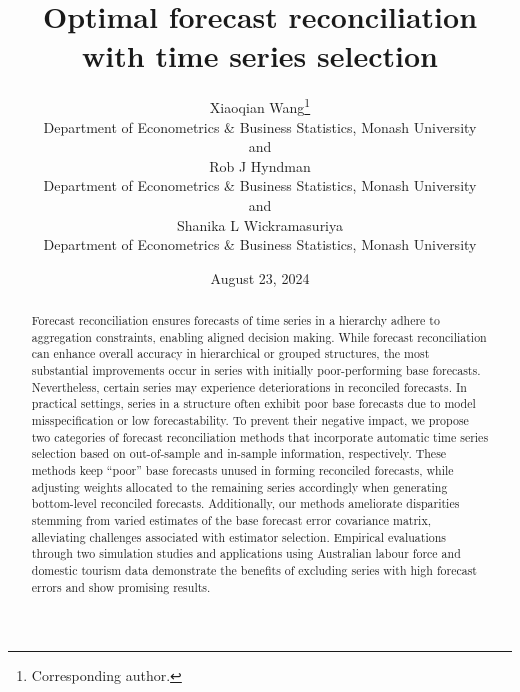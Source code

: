 \documentclass[
  11pt]{article}
\theoremstyle{plain}
\theoremstyle{remark}
\begin{document}
\def\spacingset#1{\renewcommand{\baselinestretch}%
{#1}\small\normalsize} \spacingset{1}

\renewcommand*{\arraystretch}{0.5} %


\date{August 23, 2024}
\title{\bf Optimal forecast reconciliation with time series selection}
\author{
Xiaoqian Wang\thanks{Corresponding author.} \vspace{0.2em}\\
Department of Econometrics \& Business Statistics, Monash
University \vspace{0.2em}\\
and \vspace{0.2em}\\Rob J Hyndman \vspace{0.2em}\\
Department of Econometrics \& Business Statistics, Monash
University \vspace{0.2em}\\
and \vspace{0.2em}\\Shanika L Wickramasuriya \vspace{0.2em}\\
Department of Econometrics \& Business Statistics, Monash
University \vspace{0.2em}\\
}
\maketitle

\bigskip
\bigskip
\begin{abstract}
Forecast reconciliation ensures forecasts of time series in a hierarchy
adhere to aggregation constraints, enabling aligned decision making.
While forecast reconciliation can enhance overall accuracy in
hierarchical or grouped structures, the most substantial improvements
occur in series with initially poor-performing base forecasts.
Nevertheless, certain series may experience deteriorations in reconciled
forecasts. In practical settings, series in a structure often exhibit
poor base forecasts due to model misspecification or low
forecastability. To prevent their negative impact, we propose two
categories of forecast reconciliation methods that incorporate automatic
time series selection based on out-of-sample and in-sample information,
respectively. These methods keep ``poor'' base forecasts unused in
forming reconciled forecasts, while adjusting weights allocated to the
remaining series accordingly when generating bottom-level reconciled
forecasts. Additionally, our methods ameliorate disparities stemming
from varied estimates of the base forecast error covariance matrix,
alleviating challenges associated with estimator selection. Empirical
evaluations through two simulation studies and applications using
Australian labour force and domestic tourism data demonstrate the
benefits of excluding series with high forecast errors and show
promising results.
\end{abstract}
\end{document}
